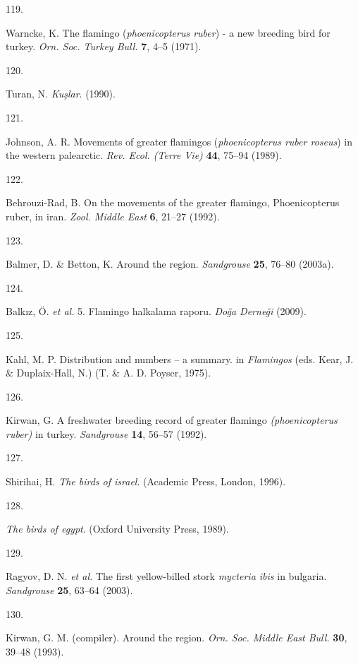 \documentclass[
  letterpaper,
  DIV=11,
  numbers=noendperiod]{scrreprt}
\newlength{\cslhangindent}
\newlength{\csllabelwidth}
\newenvironment{CSLReferences}[2] %
 {\begin{list}{}{%
  \setlength{\itemindent}{0pt}
  \setlength{\leftmargin}{0pt}
  \setlength{\parsep}{0pt}
  \ifodd #1
   \setlength{\leftmargin}{\cslhangindent}
   \setlength{\itemindent}{-1\cslhangindent}
  \fi
  \setlength{\itemsep}{#2\baselineskip}}}
 {\end{list}}
\newcommand{\CSLLeftMargin}[1]{\parbox[t]{\csllabelwidth}{\strut#1\strut}}
\newcommand{\CSLRightInline}[1]{\parbox[t]{\linewidth - \csllabelwidth}{\strut#1\strut}}
\begin{document}
\begin{CSLReferences}{0}{0}
\CSLLeftMargin{119. }%
\CSLRightInline{Warncke, K. The flamingo (\emph{phoenicopterus ruber}) -
a new breeding bird for turkey. \emph{Orn. Soc. Turkey Bull.}
\textbf{7}, 4--5 (1971).}

\CSLLeftMargin{120. }%
\CSLRightInline{Turan, N. \emph{Kuşlar}. (1990).}

\CSLLeftMargin{121. }%
\CSLRightInline{Johnson, A. R. Movements of greater flamingos
(\emph{phoenicopterus ruber roseus}) in the western palearctic.
\emph{Rev. Ecol. (Terre Vie)} \textbf{44}, 75--94 (1989).}

\CSLLeftMargin{122. }%
\CSLRightInline{Behrouzi-Rad, B. On the movements of the greater
flamingo, {Phoenicopterus ruber}, in iran. \emph{Zool. Middle East}
\textbf{6}, 21--27 (1992).}

\CSLLeftMargin{123. }%
\CSLRightInline{Balmer, D. \& Betton, K. Around the region.
\emph{Sandgrouse} \textbf{25}, 76--80 (2003a).}

\CSLLeftMargin{124. }%
\CSLRightInline{Balkız, Ö. \emph{et al.} 5. Flamingo halkalama raporu.
\emph{Doğa Derneği} (2009).}

\CSLLeftMargin{125. }%
\CSLRightInline{Kahl, M. P. Distribution and numbers -- a summary. in
\emph{Flamingos} (eds. Kear, J. \& Duplaix-Hall, N.) (T. \& A. D.
Poyser, 1975).}

\CSLLeftMargin{126. }%
\CSLRightInline{Kirwan, G. A freshwater breeding record of greater
flamingo \emph{(phoenicopterus ruber)} in turkey. \emph{Sandgrouse}
\textbf{14}, 56--57 (1992).}

\CSLLeftMargin{127. }%
\CSLRightInline{Shirihai, H. \emph{The birds of israel}. (Academic
Press, London, 1996).}

\CSLLeftMargin{128. }%
\CSLRightInline{\emph{The birds of egypt}. (Oxford University Press,
1989).}

\CSLLeftMargin{129. }%
\CSLRightInline{Ragyov, D. N. \emph{et al.} The first yellow-billed
stork \emph{mycteria ibis} in bulgaria. \emph{Sandgrouse} \textbf{25},
63--64 (2003).}

\CSLLeftMargin{130. }%
\CSLRightInline{Kirwan, G. M. (compiler). Around the region. \emph{Orn.
Soc. Middle East Bull.} \textbf{30}, 39--48 (1993).}


\end{CSLReferences}
\end{document}
